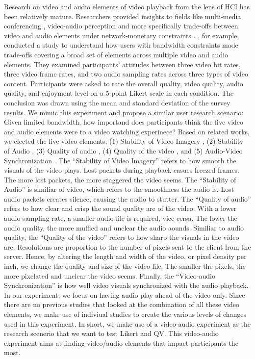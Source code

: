 Research on video and audio elements of video playback from the lens of HCI has been relatively mature.
Researchers provided insights to fields like multi-media conferencing \cite{watson1996evaluating}, video-audio perception \cite{chen2006cognitive, molnar2015assessing}and more specifically trade-offs between video and audio elements under network-monetary constraints \cite{molnar2013comedy, oeldorf2012bad}.
\textcite{oeldorf2012bad}, for example, conducted a study to understand how users with bandwidth constraints made trade-offs covering a broad set of elements across multiple video and audio elements. 
They examined participants' attitudes between three video bit rates, three video frame rates, and two audio sampling rates across three types of video content.
Participants were asked to rate the overall quality, video quality, audio quality, and enjoyment level on a 5-point Likert scale in each condition. 
The conclusion was drawn using the mean and standard deviation of the survey results.
We mimic this experiment and propose a similar user research scenario: 
Given limited bandwidth, how importand does participants think
the five video and audio elements were to a video watching experinece?
Based on related works, we elected the five video elements: (1) Stability of Video Imagery \cite{claypool1999effects}, (2) Stability of Audio \cite{claypool1999effects}, (3) Quality of audio \cite{oeldorf2012bad, noll1993wideband}, (4) Quality of the video \cite{oeldorf2012bad, knoche2008low}, and (5) Audio-Video Synchronization \cite{steinmetz1996human}. 
The ``Stability of Video Imagery'' refers to how smooth the visuals of the video plays. 
Lost packets during playback casues freezed frames. The more lost packets, the more staggered the video seems.
The ``Stability of Audio'' is similiar of video, which refers to the smoothness the audio is. Lost audio packets creates silence, causing the audio to stutter. 
The ``Quality of audio'' refers to how clear and crisp the sound quality are of the video.
With a lower audio sampling rate,
a smaller audio file is required, vice cersa.
The lower the audio quality, the more muffled and unclear the audio aounds.
Similiar to audio quality, the ``Quality of the video'' refers to how sharp the visuals in the video are.
Resolutions are proportion to the number of pixels sent to the client from the server. Hence, by altering the length and width of the video, or pixel density per inch, we change the quality and size of the video file. The smaller the pixels,
the more pixelated and unclear the video seems.
Finally, the ``Video-audio Synchronization'' is how well video visuals synchronized with the audio playback.
In our experiment, we focus on having audio play ahead of the video only.
Since there are no previous studies that looked at the combination of all these video elements, we make use of indiviual studies to create the various levels of changes used in this experiment.
In short, we make use of a video-audio experiment as the research scenerio that we want to test Likert and QV.
This video-audio experiment aims at finding video/audio elements that impact participants the most.

